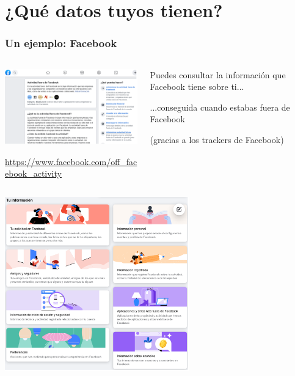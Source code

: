 %
%

\section{¿Qué datos tuyos tienen?}

\begin{frame}
\frametitle{Un ejemplo: Facebook}

\begin{columns}[T]
\begin{column}{.65\textwidth}
\includegraphics[width=8cm]{figs/facebook-offsite}

\begin{flushright}
{\footnotesize
\url{https://www.facebook.com/off_facebook_activity}
}
\end{flushright}

\end{column}%
\hfill%
\begin{column}{.32\textwidth}
  Puedes consultar la información que Facebook tiene sobre ti...

  ...conseguida cuando estabas fuera de Facebook

  (gracias a los trackers de Facebook)
\end{column}%
\end{columns}

\end{frame}


\begin{frame}
  \begin{center}
    \includegraphics[width=8cm]{figs/facebook-offsite-2}
  \end{center}
\end{frame}


